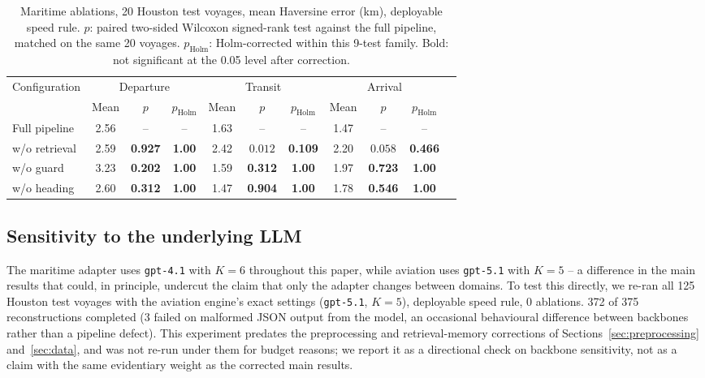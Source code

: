 \begin{table}[t]
\centering
\caption{Maritime ablations, 20 Houston test voyages, mean Haversine error
(km), deployable speed rule. $p$: paired two-sided Wilcoxon signed-rank
test against the full pipeline, matched on the same 20 voyages.
$p_{\text{Holm}}$: Holm-corrected within this 9-test family. Bold: not
significant at the 0.05 level after correction.}
\label{tab:maritime-ablation}
\scriptsize
\setlength{\tabcolsep}{2.5pt}
\begin{tabular}{lcccccccccc}
\toprule
\multirow{2}{*}{Configuration} & \multicolumn{3}{c}{Departure} & \multicolumn{3}{c}{Transit} & \multicolumn{3}{c}{Arrival} \\
\cmidrule(lr){2-4}\cmidrule(lr){5-7}\cmidrule(lr){8-10}
 & Mean & $p$ & $p_{\text{Holm}}$ & Mean & $p$ & $p_{\text{Holm}}$ & Mean & $p$ & $p_{\text{Holm}}$ \\
\midrule
Full pipeline & 2.56 & -- & -- & 1.63 & -- & -- & 1.47 & -- & -- \\
w/o retrieval & 2.59 & \textbf{0.927} & \textbf{1.00} & 2.42 & $0.012$ & \textbf{0.109} & 2.20 & $0.058$ & \textbf{0.466} \\
w/o guard & 3.23 & \textbf{0.202} & \textbf{1.00} & 1.59 & \textbf{0.312} & \textbf{1.00} & 1.97 & \textbf{0.723} & \textbf{1.00} \\
w/o heading & 2.60 & \textbf{0.312} & \textbf{1.00} & 1.47 & \textbf{0.904} & \textbf{1.00} & 1.78 & \textbf{0.546} & \textbf{1.00} \\
\bottomrule
\end{tabular}
\end{table}

\subsection{Sensitivity to the underlying LLM}
\label{sec:maritime-backbone}

The maritime adapter uses \texttt{gpt-4.1} with $K=6$ throughout this
paper, while aviation uses \texttt{gpt-5.1} with $K=5$ -- a difference in
the main results that could, in principle, undercut the claim that only
the adapter changes between domains. To test this directly, we re-ran all
125 Houston test voyages with the aviation engine's exact settings
(\texttt{gpt-5.1}, $K=5$), deployable speed rule, 0 ablations. 372 of 375
reconstructions completed (3 failed on malformed JSON output from the
model, an occasional behavioural difference between backbones rather than
a pipeline defect). This experiment predates the preprocessing and
retrieval-memory corrections of Sections~\ref{sec:preprocessing}
and~\ref{sec:data}, and was not re-run under them for budget reasons; we
report it as a directional check on backbone sensitivity, not as a claim
with the same evidentiary weight as the corrected main results.

